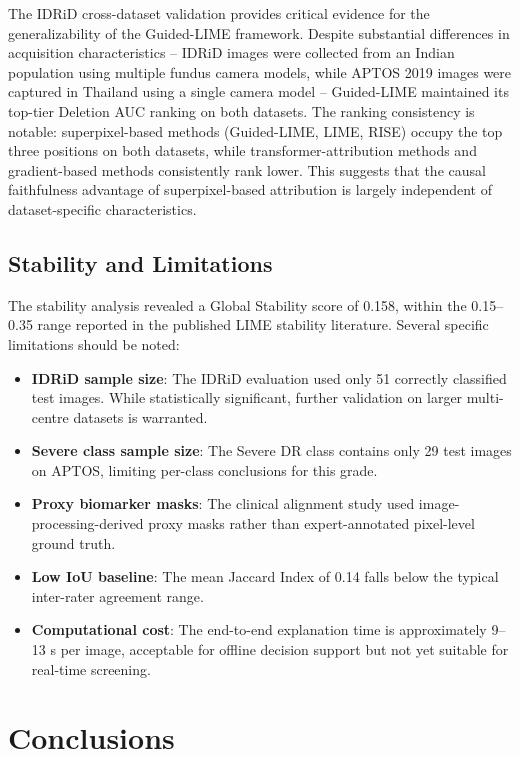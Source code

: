 \documentclass[10pt,twoside]{article}
\begin{document}
The IDRiD cross-dataset validation provides critical evidence for the generalizability of the Guided-LIME framework. Despite substantial differences in acquisition characteristics -- IDRiD images were collected from an Indian population using multiple fundus camera models, while APTOS 2019 images were captured in Thailand using a single camera model -- Guided-LIME maintained its top-tier Deletion AUC ranking on both datasets. The ranking consistency is notable: superpixel-based methods (Guided-LIME, LIME, RISE) occupy the top three positions on both datasets, while transformer-attribution methods and gradient-based methods consistently rank lower. This suggests that the causal faithfulness advantage of superpixel-based attribution is largely independent of dataset-specific characteristics.

\subsection{Stability and Limitations}

The stability analysis revealed a Global Stability score of 0.158, within the 0.15--0.35 range reported in the published LIME stability literature. Several specific limitations should be noted:

\begin{itemize}
\item \textbf{IDRiD sample size}: The IDRiD evaluation used only 51 correctly classified test images. While statistically significant, further validation on larger multi-centre datasets is warranted.
\item \textbf{Severe class sample size}: The Severe DR class contains only 29 test images on APTOS, limiting per-class conclusions for this grade.
\item \textbf{Proxy biomarker masks}: The clinical alignment study used image-processing-derived proxy masks rather than expert-annotated pixel-level ground truth.
\item \textbf{Low IoU baseline}: The mean Jaccard Index of 0.14 falls below the typical inter-rater agreement range.
\item \textbf{Computational cost}: The end-to-end explanation time is approximately 9--13 s per image, acceptable for offline decision support but not yet suitable for real-time screening.
\end{itemize}

\section{Conclusions}
\label{sec:conclusions}
\end{document}
